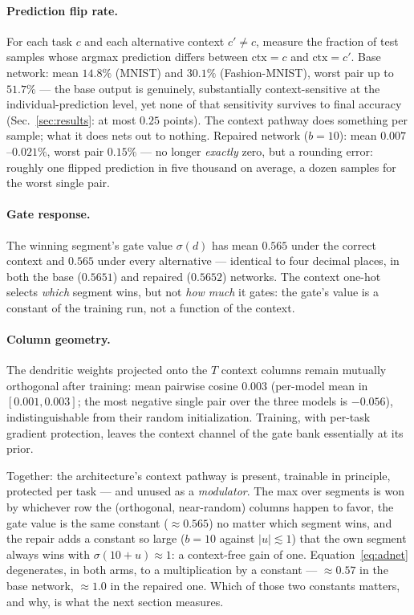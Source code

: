 \documentclass[review,12pt,number]{elsarticle}
\begin{document}
\paragraph{Prediction flip rate.} For each task $c$ and each alternative
context $c' \ne c$, measure the fraction of test samples whose argmax
prediction differs between $\mathrm{ctx}{=}c$ and $\mathrm{ctx}{=}c'$.
Base network: mean $14.8\%$ (MNIST) and $30.1\%$ (Fashion-MNIST), worst
pair up to $51.7\%$ --- the base output is genuinely, substantially
context-sensitive at the individual-prediction level, yet none of that
sensitivity survives to final accuracy (Sec.~\ref{sec:results}: at most
$0.25$ points). The context pathway does something per sample; what it
does nets out to nothing. Repaired network ($b{=}10$): mean
$0.007$--$0.021\%$, worst pair $0.15\%$ --- no longer \emph{exactly}
zero, but a rounding error: roughly one flipped prediction in five
thousand on average, a dozen samples for the worst single pair.

\paragraph{Gate response.} The winning segment's gate value
$\sigma(d)$ has mean $0.565$ under the correct context and $0.565$
under every alternative --- identical to four decimal places, in both
the base ($0.5651$) and repaired ($0.5652$) networks. The context
one-hot selects \emph{which} segment wins, but not \emph{how much} it
gates: the gate's value is a constant of the training run, not a
function of the context.

\paragraph{Column geometry.} The dendritic weights projected onto the
$T$ context columns remain mutually orthogonal after training: mean
pairwise cosine $0.003$ (per-model mean in $[0.001, 0.003]$; the most
negative single pair over the three models is $-0.056$), indistinguishable
from their random initialization. Training, with per-task gradient
protection, leaves the context channel of the gate bank essentially at
its prior.

Together: the architecture's context pathway is present, trainable in
principle, protected per task --- and unused as a \emph{modulator}. The
max over segments is won by whichever row the (orthogonal, near-random)
columns happen to favor, the gate value is the same constant
($\approx 0.565$) no matter which segment wins, and the repair adds a
constant so large ($b{=}10$ against $|u| \lesssim 1$) that the own
segment always wins with $\sigma(10 + u) \approx 1$: a context-free
gain of one. Equation~\ref{eq:adnet} degenerates, in both arms, to a
multiplication by a constant --- ${\approx}0.57$ in the base network,
${\approx}1.0$ in the repaired one. Which of those two constants
matters, and why, is what the next section measures.
\end{document}
